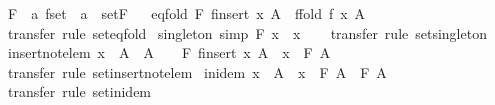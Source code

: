 \begin{isabellebody}
\ F\ {\isacharcolon}{\isacharcolon}\ {\isachardoublequoteopen}{\isacharprime}a\ fset\ {\isasymRightarrow}\ {\isacharprime}a{\isachardoublequoteclose}\ \ set{\isachardot}F%
\isadelimproof
\ %
\endisadelimproof
%
\isatagproof
\isacommand{{\isachardot}}\isamarkupfalse%
%
\endisatagproof
{\isafoldproof}%
%
\isadelimproof
%
\endisadelimproof
\isanewline
\isanewline
{}\isamarkupfalse%
\ eq{\isacharunderscore}fold{\isacharcolon}\ {\isachardoublequoteopen}F\ {\isacharparenleft}finsert\ x\ A{\isacharparenright}\ {\isacharequal}\ ffold\ f\ x\ A{\isachardoublequoteclose}\isanewline
%
\isadelimproof
\ \ %
\endisadelimproof
%
\isatagproof
{}\isamarkupfalse%
\ transfer\ {\isacharparenleft}rule\ set{\isachardot}eq{\isacharunderscore}fold{\isacharparenright}%
\endisatagproof
{\isafoldproof}%
%
\isadelimproof
\isanewline
%
\endisadelimproof
\isanewline
{}\isamarkupfalse%
\ singleton\ {\isacharbrackleft}simp{\isacharbrackright}{\isacharcolon}\ {\isachardoublequoteopen}F\ {\isacharbraceleft}{\isacharbar}x{\isacharbar}{\isacharbraceright}\ {\isacharequal}\ x{\isachardoublequoteclose}\isanewline
%
\isadelimproof
\ \ %
\endisadelimproof
%
\isatagproof
{}\isamarkupfalse%
\ transfer\ {\isacharparenleft}rule\ set{\isachardot}singleton{\isacharparenright}%
\endisatagproof
{\isafoldproof}%
%
\isadelimproof
\isanewline
%
\endisadelimproof
\isanewline
{}\isamarkupfalse%
\ insert{\isacharunderscore}not{\isacharunderscore}elem{\isacharcolon}\ {\isachardoublequoteopen}x\ {\isacharbar}{\isasymnotin}{\isacharbar}\ A\ {\isasymLongrightarrow}\ A\ {\isasymnoteq}\ {\isacharbraceleft}{\isacharbar}{\isacharbar}{\isacharbraceright}\ {\isasymLongrightarrow}\ F\ {\isacharparenleft}finsert\ x\ A{\isacharparenright}\ {\isacharequal}\ x\ \isactrlbold {\isacharasterisk}\ F\ A{\isachardoublequoteclose}\isanewline
%
\isadelimproof
\ \ %
\endisadelimproof
%
\isatagproof
{}\isamarkupfalse%
\ transfer\ {\isacharparenleft}rule\ set{\isachardot}insert{\isacharunderscore}not{\isacharunderscore}elem{\isacharparenright}%
\endisatagproof
{\isafoldproof}%
%
\isadelimproof
\isanewline
%
\endisadelimproof
\isanewline
{}\isamarkupfalse%
\ in{\isacharunderscore}idem{\isacharcolon}\ {\isachardoublequoteopen}x\ {\isacharbar}{\isasymin}{\isacharbar}\ A\ {\isasymLongrightarrow}\ x\ \isactrlbold {\isacharasterisk}\ F\ A\ {\isacharequal}\ F\ A{\isachardoublequoteclose}\isanewline
%
\isadelimproof
\ \ %
\endisadelimproof
%
\isatagproof
{}\isamarkupfalse%
\ transfer\ {\isacharparenleft}rule\ set{\isachardot}in{\isacharunderscore}idem{\isacharparenright}%

\end{isabellebody}
